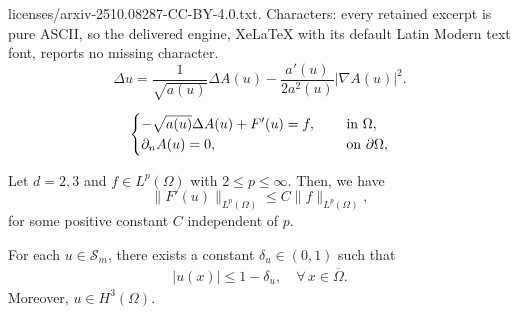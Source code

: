 \documentclass[10pt,a4paper]{amsart}
\def\n{\textbf{\textit{n}}}
\def\u{u}
\begin{document}
licenses/arxiv-2510.08287-CC-BY-4.0.txt. Characters: every retained excerpt is pure ASCII, so the delivered engine, XeLaTeX with its default Latin Modern text font, reports no missing character.
\begin{equation}
\label{phi-Aphi-rel}
\Delta u= \frac{1}{\sqrt{a(u)}} \Delta A(u) - \frac{a'(u)}{2 a^2(u)} | \nabla A(u)|^2.
\end{equation}

\begin{equation}
\label{NEUMANNSING}
\begin{cases}
-\sqrt{a(\u)}\Delta A(\u)+F'(\u)=f,\quad &\text{ in }\Omega,\\
\partial_\n A(\u)=0, \quad &\text{ on }\partial \Omega,
\end{cases}
\end{equation}

\begin{lemma}
\label{ell2}
Let $d=2,3$ and  $f\in L^p(\Omega)$ with $2\leq p \leq \infty$.
Then, we have
$$
\| F'(\u)\|_{L^p(\Omega)}\leq C\| f\|_{L^p(\Omega)},
$$
for some positive constant $C$ independent of $p$.
\end{lemma}

\begin{proposition}\label{esci}
For each $\u\in \mathcal{S}_m$, there exists a constant $\delta_u \in (0,1)$ such that
 \begin{align}
 |\u(x)|\leq 1-\delta_u, \quad \forall\, x\in \overline{\Omega}.\label{sepsta}
 \end{align}
 Moreover, $\u\in H^3(\Omega)$.
 \end{proposition}
\end{document}
